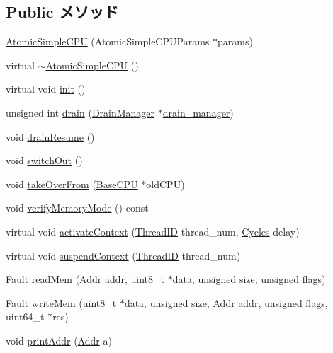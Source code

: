 \subsection*{Public メソッド}
\begin{DoxyCompactItemize}
\item 
\hyperlink{classAtomicSimpleCPU_ad25e81d46bd9fe8b4f176b129a012bc6}{AtomicSimpleCPU} (AtomicSimpleCPUParams $\ast$params)
\item 
virtual \hyperlink{classAtomicSimpleCPU_a0c1821e85cf304f5a090c51f3460d577}{$\sim$AtomicSimpleCPU} ()
\item 
virtual void \hyperlink{classAtomicSimpleCPU_a02fd73d861ef2e4aabb38c0c9ff82947}{init} ()
\item 
unsigned int \hyperlink{classAtomicSimpleCPU_a4e932bfc8aa6dfb998b8496a0f04ace3}{drain} (\hyperlink{classDrainManager}{DrainManager} $\ast$\hyperlink{classAtomicSimpleCPU_af9ba920f669cbe0f18c71846715d690a}{drain\_\-manager})
\item 
void \hyperlink{classAtomicSimpleCPU_a8f020d3237536fe007fc488c4125c5d8}{drainResume} ()
\item 
void \hyperlink{classAtomicSimpleCPU_a05f299b443f8cc73a93d61572edc0218}{switchOut} ()
\item 
void \hyperlink{classAtomicSimpleCPU_ac82d2b8d331b2e8e6854a95d2917dfa2}{takeOverFrom} (\hyperlink{classBaseCPU_1_1BaseCPU}{BaseCPU} $\ast$oldCPU)
\item 
void \hyperlink{classAtomicSimpleCPU_ae2e1ccebe596a180f8105d57f9a93645}{verifyMemoryMode} () const 
\item 
virtual void \hyperlink{classAtomicSimpleCPU_ad7a501b28bdbe8b3e708cd1ef69ac191}{activateContext} (\hyperlink{base_2types_8hh_ab39b1a4f9dad884694c7a74ed69e6a6b}{ThreadID} thread\_\-num, \hyperlink{classCycles}{Cycles} delay)
\item 
virtual void \hyperlink{classAtomicSimpleCPU_a1dad4c4d2c3df4ef367e14fcc973ce74}{suspendContext} (\hyperlink{base_2types_8hh_ab39b1a4f9dad884694c7a74ed69e6a6b}{ThreadID} thread\_\-num)
\item 
\hyperlink{classRefCountingPtr}{Fault} \hyperlink{classAtomicSimpleCPU_a66191b2d8a45050b7df3c3efa7bb07c6}{readMem} (\hyperlink{base_2types_8hh_af1bb03d6a4ee096394a6749f0a169232}{Addr} addr, uint8\_\-t $\ast$data, unsigned size, unsigned flags)
\item 
\hyperlink{classRefCountingPtr}{Fault} \hyperlink{classAtomicSimpleCPU_ad46c5edeb1ee9b60445f3e26364e2c5e}{writeMem} (uint8\_\-t $\ast$data, unsigned size, \hyperlink{base_2types_8hh_af1bb03d6a4ee096394a6749f0a169232}{Addr} addr, unsigned flags, uint64\_\-t $\ast$res)
\item 
void \hyperlink{classAtomicSimpleCPU_a88aa41e2693dd0091afae2604eba9bed}{printAddr} (\hyperlink{base_2types_8hh_af1bb03d6a4ee096394a6749f0a169232}{Addr} a)
\end{DoxyCompactItemize}
